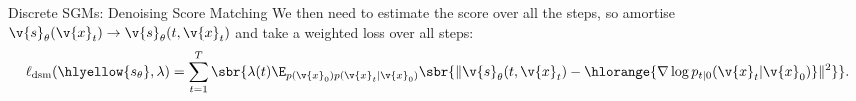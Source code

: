 \begin{frame}{Discrete SGMs: Denoising Score Matching \cite{vincent2011connection}}
\pause
We then need to estimate the score over all the steps, so amortise $ \v{s}_\theta(\v{x}_t) \to  \v{s}_\theta(t, \v{x}_t)$ and take a weighted loss over all steps:
\begin{align*} 
   \ell_{\textrm{dsm}}(\hlyellow{s_\theta}, \lambda) =  \sum_{t=1}^T \sbr{ \lambda(t) \E_{p(\v{x}_0) p(\v{x}_t | \v{x}_0)}\sbr{ \| \v{s}_\theta(t, \v{x}_t) -  \hlorange{\nabla \log p_{t|0}(\v{x}_t|\v{x}_0)}\|^2}}.
\end{align*}


\end{frame}

